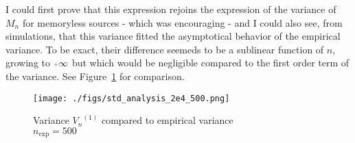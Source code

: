 	I could first prove that this expression rejoins the expression of 
	the variance of $M_n$ for memoryless sources - which was encouraging -
	and I could also see, from simulations, that this variance fitted the 
	asymptotical behavior of the empirical variance. To be exact, 
	their difference seemeds to be a sublinear function of $n$, growing
	to $\pinf$ but which would be negligible compared to the first 
	order term of the variance. See Figure~\ref{std_nein} for comparison.
	
	
	  \begin{figure}
		\centering
        \texttt{[image: ./figs/std\_analysis\_2e4\_500.png]}	
		\caption{Variance ${V_n}^{(1)}$ compared to empirical variance\\
				 $n_{\text{exp}} = 500$}
		\label{std_nein}
	  \end{figure} 
	
	
	
	
	
	
	
	
